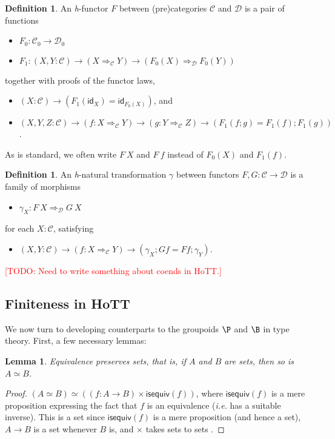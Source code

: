 \documentclass[preprint,authoryear]{sigplanconf}
\newcommand{\todo}[1]{\textcolor{red}{[TODO: #1]}}
\newcommand{\todo}[1]{}
\newcommand{\ie}{\latin{i.e.}\xspace}
\newcommand{\latin}[1]{\textit{#1}}
\newcommand{\mcal}[1]{\ensuremath{\mathcal{#1}}}
\newcommand{\msf}[1]{\ensuremath{\mathsf{#1}}\xspace}
\renewcommand{\equiv}{\simeq}         %
\newtheorem{lem}[thm]{Lemma}
\theoremstyle{definition}
\newtheorem{defn}[thm]{Definition}
\theoremstyle{remark}
\newcommand{\cons}[1]{\ensuremath{\mathsf{#1}}}
\newcommand{\hott}[1]{\textit{h}-#1}
\newcommand{\homsymb}{\Rightarrow}
\providecommand{\hom}{}
\renewcommand{\hom}[3][]{#2 \homsymb_{#1} #3}
\newcommand{\CT}{\mcal{C}}
\newcommand{\DT}{\mcal{D}}
\newcommand{\idT}{\msf{id}}
\newcommand{\then}{\mathbin{;}}                       %
\begin{document}
\begin{defn}
  An \hott{functor} $F$ between (pre)categories $\CT$
  and $\DT$ is a pair of functions
  \begin{itemize}
  \item $F_0 : \CT_0 \to \DT_0$
  \item $F_1 : (X,Y : \CT) \to (\hom[\CT] X Y) \to (\hom[\DT] {F_0(X)} {F_0(Y)})$
  \end{itemize}
  together with proofs of the functor laws,
  \begin{itemize}
  \item $(X : \CT) \to (F_1(\idT_X) = \idT_{F_0(X)})$, and
  \item $(X,Y,Z : \CT) \to (f : \hom[\CT] X Y) \to (g : \hom[\CT] Y Z)
    \to (F_1(f \then g) = F_1(f) \then F_1(g))$.
  \end{itemize}
\end{defn}

As is standard, we often write $F\ X$ and $F\ f$ instead of $F_0(X)$
and $F_1(f)$.

\begin{defn}
  An \hott{natural transformation} $\gamma$ between functors $F,G :
  \CT \to \DT$ is a family of morphisms
  \begin{itemize}
  \item $\gamma_X : \hom[\DT] {F\ X} {G\ X}$
  \end{itemize}
  for each $X : \CT$, satisfying
  \begin{itemize}
  \item $(X,Y : \CT) \to (f : \hom[\CT] X Y) \to (\gamma_X \then G f
    = F f \then \gamma_Y)$.
  \end{itemize}
\end{defn}

\todo{Need to write something about coends in HoTT.}

\subsection{Finiteness in HoTT}
\label{sec:finiteness-HoTT}

We now turn to developing counterparts to the groupoids $\P$ and $\B$
in type theory.  First, a few necessary lemmas:
\begin{lem} \label{lem:equiv-pres-set}
  Equivalence preserves sets, that is, if $A$ and
  $B$ are sets, then so is $A \equiv B$.
\end{lem}
\begin{proof}
  $(A \equiv B) \equiv ((f : A \to B) \times \cons{isequiv}(f))$, where
  $\cons{isequiv}(f)$ is a mere proposition expressing the fact that
  $f$ is an equivalence (\ie has a suitable inverse).  This is a set
  since $\cons{isequiv}(f)$ is a mere proposition (and hence a set),
  $A \to B$ is a set whenever $B$ is, and $\times$ takes sets to sets
  \citep[Lemma 3.3.4, Examples 3.1.5 and 3.1.6]{hottbook}.
\end{proof}
\end{document}
